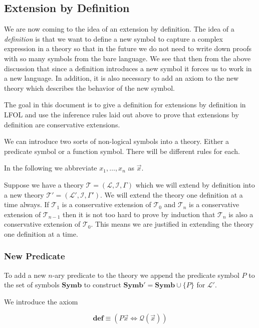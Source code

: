 \documentclass[12pt]{article}
\newcommand{\bv}[1]{\boldsymbol{#1}}
\newcommand{\mc}[1]{\mathcal{#1}}
\newcommand{\bc}[1]{\bv{\mc{#1}}}
\begin{document}
\subsection{Extension by Definition}

We are now coming to the idea of an extension by definition. The idea of a \textit{definition} is that we want to define a new symbol to capture a complex expression in a theory so that in the future we do not need to write down proofs with so many symbols from the bare language. We see that then from the above discussion that since a definition introduces a new symbol it forces us to work in a new language. In addition, it is also necessary to add an axiom to the new theory which describes the behavior of the new symbol. 

The goal in this document is to give a definition for extensions by definition in LFOL and use the inference rules laid out above to prove that extensions by definition are conservative extensions.

We can introduce two sorts of non-logical symbols into a theory. Either a predicate symbol or a function symbol. There will be different rules for each.

In the following we abbreviate $x_1,\ldots,x_n$ as $\vec{x}$.

Suppose we have a theory $\bc{T} = (\bv{\mc{L}},\bc{I},\Gamma)$ which we will extend by definition into a new theory $\bc{T}' = (\bv{\mc{L}}',\bc{I},\Gamma')$. We will extend the theory one definition at a time always. If $\bc{T}_1$ is a conservative extension of $\bc{T}_0$ and $\bc{T}_n$ is a conservative extension of $\bc{T}_{n-1}$ then it is not too hard to prove by induction that $\bc{T}_n$ is also a conservative extension of $\bc{T}_0$. This means we are justified in extending the theory one definition at a time.

\subsubsection*{New Predicate}

To add a new $n$-ary predicate to the theory we append the predicate symbol $P$ to the set of symbols $\mathbf{Symb}$ to construct $\mathbf{Symb}' = \mathbf{Symb}\cup \{P\}$ for $\bv{\mc{L}}'$.

We introduce the axiom

\begin{equation}
\textbf{def} \equiv (P\vec{x} \iff \mc{Q}(\vec{x}))
\end{equation}
\end{document}
